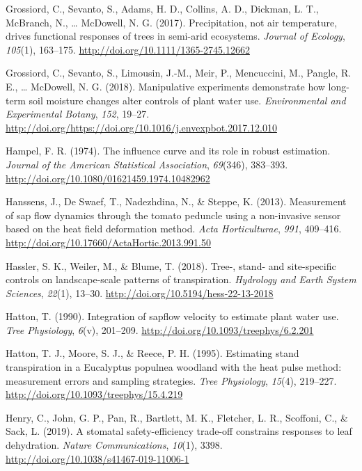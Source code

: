 \documentclass[11pt,twoside]{reedthesis}
\begin{document}
\hypertarget{ref-grossiord_precipitation_2017}{}
Grossiord, C., Sevanto, S., Adams, H. D., Collins, A. D., Dickman, L.
T., McBranch, N., \ldots{} McDowell, N. G. (2017). Precipitation, not
air temperature, drives functional responses of trees in semi-arid
ecosystems. \emph{Journal of Ecology}, \emph{105}(1), 163--175.
\url{http://doi.org/10.1111/1365-2745.12662}

\hypertarget{ref-Grossiord2018}{}
Grossiord, C., Sevanto, S., Limousin, J.-M., Meir, P., Mencuccini, M.,
Pangle, R. E., \ldots{} McDowell, N. G. (2018). Manipulative experiments
demonstrate how long-term soil moisture changes alter controls of plant
water use. \emph{Environmental and Experimental Botany}, \emph{152},
19--27.
\url{http://doi.org/https://doi.org/10.1016/j.envexpbot.2017.12.010}

\hypertarget{ref-Hampel1974}{}
Hampel, F. R. (1974). The influence curve and its role in robust
estimation. \emph{Journal of the American Statistical Association},
\emph{69}(346), 383--393.
\url{http://doi.org/10.1080/01621459.1974.10482962}

\hypertarget{ref-Hanssens2013}{}
Hanssens, J., De Swaef, T., Nadezhdina, N., \& Steppe, K. (2013).
Measurement of sap flow dynamics through the tomato peduncle using a
non-invasive sensor based on the heat field deformation method.
\emph{Acta Horticulturae}, \emph{991}, 409--416.
\url{http://doi.org/10.17660/ActaHortic.2013.991.50}

\hypertarget{ref-Hassler2018}{}
Hassler, S. K., Weiler, M., \& Blume, T. (2018). Tree-, stand- and
site-specific controls on landscape-scale patterns of transpiration.
\emph{Hydrology and Earth System Sciences}, \emph{22}(1), 13--30.
\url{http://doi.org/10.5194/hess-22-13-2018}

\hypertarget{ref-Hatton1990}{}
Hatton, T. (1990). Integration of sapflow velocity to estimate plant
water use. \emph{Tree Physiology}, \emph{6}(v), 201--209.
\url{http://doi.org/10.1093/treephys/6.2.201}

\hypertarget{ref-Hatton1995}{}
Hatton, T. J., Moore, S. J., \& Reece, P. H. (1995). Estimating stand
transpiration in a Eucalyptus populnea woodland with the heat pulse
method: measurement errors and sampling strategies. \emph{Tree
Physiology}, \emph{15}(4), 219--227.
\url{http://doi.org/10.1093/treephys/15.4.219}

\hypertarget{ref-henry_stomatal_2019}{}
Henry, C., John, G. P., Pan, R., Bartlett, M. K., Fletcher, L. R.,
Scoffoni, C., \& Sack, L. (2019). A stomatal safety-efficiency trade-off
constrains responses to leaf dehydration. \emph{Nature Communications},
\emph{10}(1), 3398. \url{http://doi.org/10.1038/s41467-019-11006-1}
\end{document}
